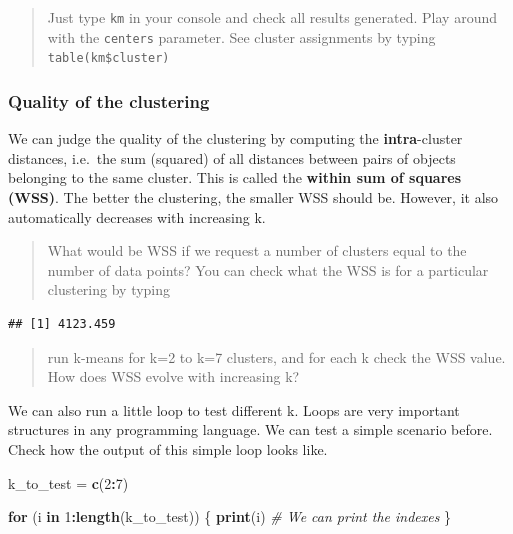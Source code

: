 \documentclass[
]{book}
\newenvironment{Shaded}{\begin{snugshade}}{\end{snugshade}}
\newcommand{\CommentTok}[1]{\textcolor[rgb]{0.56,0.35,0.01}{\textit{#1}}}
\newcommand{\ControlFlowTok}[1]{\textcolor[rgb]{0.13,0.29,0.53}{\textbf{#1}}}
\newcommand{\DecValTok}[1]{\textcolor[rgb]{0.00,0.00,0.81}{#1}}
\newcommand{\FunctionTok}[1]{\textcolor[rgb]{0.13,0.29,0.53}{\textbf{#1}}}
\newcommand{\NormalTok}[1]{#1}
\newcommand{\OtherTok}[1]{\textcolor[rgb]{0.56,0.35,0.01}{#1}}
\newcommand{\SpecialCharTok}[1]{\textcolor[rgb]{0.81,0.36,0.00}{\textbf{#1}}}
\begin{document}
\begin{quote}
Just type \texttt{km} in your console and check all results generated. Play around with the \texttt{centers} parameter. See cluster assignments by typing \texttt{table(km\$cluster)}
\end{quote}

\hypertarget{quality-of-the-clustering}{%
\subsubsection{Quality of the clustering}\label{quality-of-the-clustering}}

We can judge the quality of the clustering by computing the \textbf{intra}-cluster distances, i.e.~the sum (squared) of all distances between pairs of objects belonging to the same cluster. This is called the \textbf{within sum of squares (WSS)}. The better the clustering, the smaller WSS should be. However, it also automatically decreases with increasing k.

\begin{quote}
What would be WSS if we request a number of clusters equal to the number of data points? You can check what the WSS is for a particular clustering by typing
\end{quote}

\begin{Shaded}
\end{Shaded}

\begin{verbatim}
## [1] 4123.459
\end{verbatim}

\begin{quote}
run k-means for k=2 to k=7 clusters, and for each k check the WSS value. How does WSS evolve with increasing k?
\end{quote}

We can also run a little loop to test different k. Loops are very important structures in any programming language.
We can test a simple scenario before. Check how the output of this simple loop looks like.

\begin{Shaded}
\begin{Highlighting}[]
\NormalTok{k\_to\_test }\OtherTok{=} \FunctionTok{c}\NormalTok{(}\DecValTok{2}\SpecialCharTok{:}\DecValTok{7}\NormalTok{)}

\ControlFlowTok{for}\NormalTok{ (i }\ControlFlowTok{in} \DecValTok{1}\SpecialCharTok{:}\FunctionTok{length}\NormalTok{(k\_to\_test)) \{}
  \FunctionTok{print}\NormalTok{(i) }\CommentTok{\# We can print the indexes}
\NormalTok{\}}
\end{Highlighting}
\end{Shaded}
\end{document}
